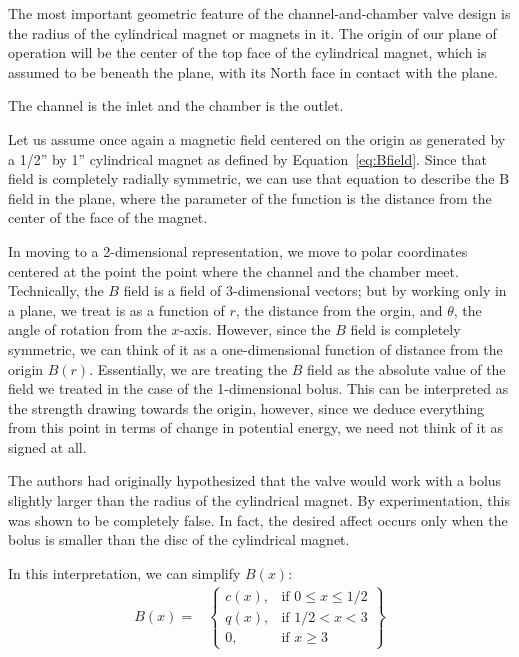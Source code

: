 \documentclass{asme2ej}
\begin{document}
The most important geometric feature of the channel-and-chamber
valve design is the radius of the cylindrical magnet or magnets
in it. The origin of our plane of operation
will be the center of the top face of the cylindrical magnet,
which is assumed to be beneath the plane, with its North face
in contact with the plane.

The channel is the inlet and the chamber is the
outlet.

Let us assume once again a magnetic field centered on the origin as generated by a
1/2'' by 1'' cylindrical magnet as defined by Equation~\ref{eq:Bfield}.
Since that field is completely radially symmetric, we can use that equation to
describe the B field in the plane, where the parameter of the function
is the distance from the center of the face of the magnet.

In moving to a 2-dimensional representation, we move to polar coordinates
centered at the point the point where the channel and the chamber meet.
Technically, the $B$ field is a field of 3-dimensional vectors; but
by working only in a plane, we treat is as a function of $r$, the distance
from the orgin, and $\theta$, the angle of rotation from the $x$-axis. However,
since the $B$ field is completely symmetric, we can think of it as a one-dimensional
function of distance from the origin $B(r)$. Essentially, we are treating the
$B$ field as the absolute value of the field we treated in the case of the 1-dimensional
bolus.
This can be interpreted as the strength drawing towards the origin, however, since
we deduce everything from this point in terms of change in potential energy,
we need not think of it as signed at all.

The authors had originally hypothesized that the valve would work with a bolus
slightly larger than the radius of the cylindrical magnet.
By experimentation, this was shown to be completely false.
In fact, the desired affect occurs only when the bolus is smaller than the
disc of the cylindrical magnet.

In this interpretation, we can simplify $B(x)$:
\begin{align}
B(x) = &
\left\{
    \begin{array}{lr}
      c(x) , & \text{if } 0 \leq x \leq 1/2 \\
      q(x) , & \text{if } 1/2 < x < 3 \\
      0 , & \text{if } x \geq 3
    \end{array}
    \right\}
    \label{eq:Bfield}
\end{align}
\end{document}
